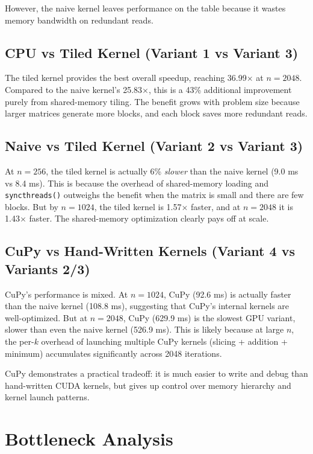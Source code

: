 \documentclass[11pt]{article}
\begin{document}
However, the naive kernel leaves performance on the table because it wastes memory bandwidth on redundant reads.

\subsection{CPU vs Tiled Kernel (Variant 1 vs Variant 3)}

The tiled kernel provides the best overall speedup, reaching 36.99$\times$ at $n = 2048$. Compared to the naive kernel's 25.83$\times$, this is a 43\% additional improvement purely from shared-memory tiling. The benefit grows with problem size because larger matrices generate more blocks, and each block saves more redundant reads.

\subsection{Naive vs Tiled Kernel (Variant 2 vs Variant 3)}

At $n = 256$, the tiled kernel is actually 6\% \emph{slower} than the naive kernel (9.0 ms vs 8.4 ms). This is because the overhead of shared-memory loading and \texttt{syncthreads()} outweighs the benefit when the matrix is small and there are few blocks. But by $n = 1024$, the tiled kernel is 1.57$\times$ faster, and at $n = 2048$ it is 1.43$\times$ faster. The shared-memory optimization clearly pays off at scale.

\subsection{CuPy vs Hand-Written Kernels (Variant 4 vs Variants 2/3)}

CuPy's performance is mixed. At $n = 1024$, CuPy (92.6 ms) is actually faster than the naive kernel (108.8 ms), suggesting that CuPy's internal kernels are well-optimized. But at $n = 2048$, CuPy (629.9 ms) is the slowest GPU variant, slower than even the naive kernel (526.9 ms). This is likely because at large $n$, the per-$k$ overhead of launching multiple CuPy kernels (slicing + addition + minimum) accumulates significantly across 2048 iterations.

CuPy demonstrates a practical tradeoff: it is much easier to write and debug than hand-written CUDA kernels, but gives up control over memory hierarchy and kernel launch patterns.

\section{Bottleneck Analysis}
\end{document}
